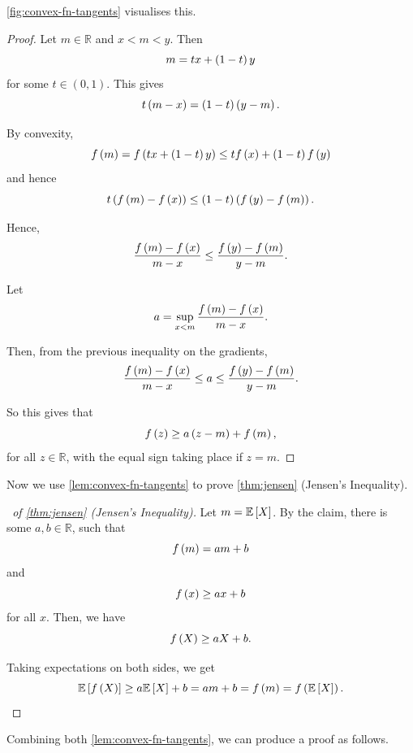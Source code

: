 \documentclass{article}
\theoremstyle{definition}
\theoremstyle{remark}
\newcommand{\RR}{\mathbb{R}}
\newcommand{\Expt}{\mathbb{E}}
\newcommand{\oointv}[2]{(#1,#2)}
\begin{document}
\autoref{fig:convex-fn-tangents} visualises this.

\begin{proof}
    Let \(m \in \RR\) and \(x < m < y\). Then
    \[
        m = tx + \left(1 - t\right)y
    \]
    for some \(t \in \oointv{0}{1}\). This gives
    \[
        t\left(m - x\right) = \left(1 - t\right) \left(y - m\right).
    \]

    By convexity,
    \[
        f\left(m\right) = f\left(tx + \left(1 - t\right) y\right) \leq t f\left(x\right) + \left(1 - t\right) f\left(y\right)
    \]
    and hence
    \[
        t\left(f\left(m\right) - f\left(x\right)\right) \leq \left(1 - t\right) \left(f\left(y\right) - f\left(m\right)\right).
    \]

    Hence,
    \[
        \frac{f\left(m\right) - f\left(x\right)}{m - x} \leq \frac{f\left(y\right) - f\left(m\right)}{y - m}.
    \]

    Let
    \[
        a = \sup_{x < m} \frac{f\left(m\right) - f\left(x\right)}{m - x}.
    \]

    Then, from the previous inequality on the gradients,
    \[
        \frac{f\left(m\right) - f\left(x\right)}{m - x} \leq a \leq \frac{f\left(y\right) - f\left(m\right)}{y - m}.
    \]

    So this gives that
    \[
        f\left(z\right) \geq a\left(z - m\right) + f\left(m\right),
    \]
    for all \(z \in \RR\), with the equal sign taking place if \(z = m\).
\end{proof}

Now we use \autoref{lem:convex-fn-tangents} to prove \autoref{thm:jensen} (Jensen's Inequality).

\begin{proof}[\proofname\ of \autoref{thm:jensen} (Jensen's Inequality)]
    Let \(m = \Expt\bqty{X}\). By the claim, there is some \(a, b \in \RR\), such that
    \[
        f\left(m\right) = am + b
    \]
    and
    \[
        f\left(x\right) \geq ax + b
    \]
    for all \(x\). Then, we have
    \[
        f\left(X\right) \geq aX + b.
    \]

    Taking expectations on both sides, we get
    \[
        \Expt\bqty{f\pqty{X}} \geq a \Expt\bqty{X} + b = am + b = f\pqty{m} = f\pqty{\Expt\bqty{X}}.
    \]
\end{proof}

Combining both \autoref{lem:convex-fn-tangents}, we can produce a proof as follows.
\end{document}
